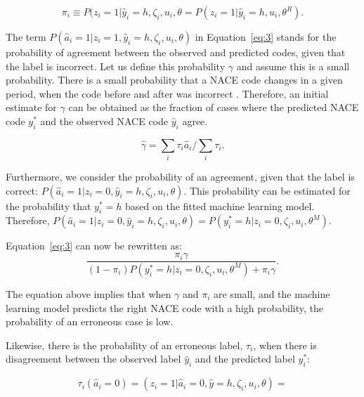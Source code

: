 \documentclass[12pt, a4paper, titlepage]{article}
\begin{document}
						\begin{equation}\label{eq:pi4}
\pi_i \equiv P(z_i = 1|\hat{y}_i = h, \zeta_i, u_i, \theta = P(z_i = 1|\hat{y}_i = h, u_i, \theta^R) .
						\end{equation} 



The term $P(\hat{a}_i=1|z_i=1, \hat{y}_i = h, \zeta_i, u_i, \theta)$ in Equation~\ref{eq:3} stands for the probability of agreement between the observed and predicted codes, given that the label is incorrect. Let us define this probability 
$\gamma$ and assume this is a small probability. There is a small probability that a NACE code changes in a given period, when the code before and after was incorrect \citep{VanDelden}. Therefore, an initial estimate for $\gamma$ can be obtained as the fraction of cases where the predicted NACE code $y^*_i$ and the observed NACE code $\hat{y}_i$ agree. 

						\begin{equation}\label{eq:gamma5}
\hat{\gamma} = \sum_{i} \tau_i \hat{a}_i / \sum_{i} \tau_i.
						\end{equation} 


Furthermore, we consider the probability of an agreement, given that the label is correct: $P(\hat{a}_i=1|z_i=0, \hat{y}_i = h, \zeta_i, u_i, \theta)$. This probability can be estimated for the probability that $y^*_i = h$ based on the fitted machine learning model. Therefore, $P(\hat{a}_i=1|z_i=0, \hat{y}_i = h, \zeta_i, u_i, \theta) = P(y^*_i = h | z_i = 0, \zeta_i, u_i, \theta^M)$. 


Equation~\ref{eq:3} can now be rewritten as:
						\begin{equation}\label{eq:6}
\frac{\pi_i \gamma}{(1-\pi_i)P(y^*_i = h | z_i = 0, \zeta_i, u_i, \theta^M) + \pi_i \gamma  }.
						\end{equation}

The equation above implies that when $\gamma$ and $\pi_i$ are small, and the machine learning model predicts the right NACE code with a high probability, the probability of an erroneous case is low.

Likewise, there is the probability of an erroneous label, $\tau_i$, when there is disagreement between the observed label $\hat{y}_i$ and the predicted label $y^*_i$:

						\begin{equation}\label{eq:7}
\tau_i(\hat{a}_i = 0) = (z_i = 1 | \hat{a}_i = 0, \hat{y} = h, \zeta_i, u_i, \theta) = 
						\end{equation}
\end{document}
